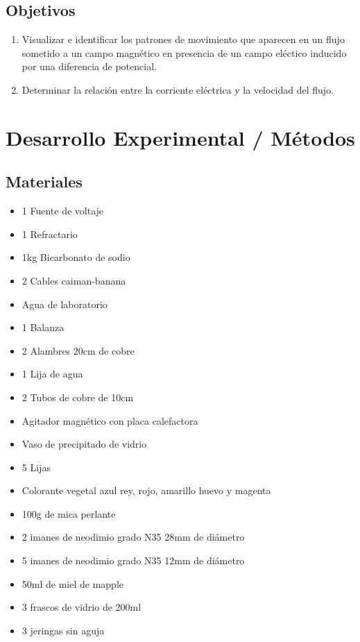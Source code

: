 \documentclass[article,12pt]{elsarticle}
\begin{document}
    \subsection{Objetivos}
    \begin{enumerate}
        \item Visualizar e identificar los patrones de movimiento que aparecen en un flujo sometido a un campo magnético en presencia de un campo eléctico inducido por una diferencia de potencial.
        \item Determinar la relación entre la corriente eléctrica y la velocidad del flujo.
    \end{enumerate}
\section{Desarrollo Experimental / Métodos}
    \subsection{Materiales}
    \begin{itemize}
    \item 1 Fuente de voltaje
    \item 1 Refractario
    \item 1kg Bicarbonato de sodio
    \item 2 Cables caiman-banana
    \item Agua de laboratorio
    \item 1 Balanza 
    \item 2 Alambres 20cm de cobre
    \item 1 Lija de agua
    \item 2 Tubos de cobre de 10cm
    \item Agitador magnético con placa calefactora
    \item Vaso de precipitado de vidrio
    \item 5 Lijas
    \item Colorante vegetal azul rey, rojo, amarillo huevo y magenta
    \item 100g de mica perlante
    \item 2 imanes de neodimio grado N35 28mm de diámetro
    \item 5 imanes de neodimio grado N35 12mm de diámetro
    \item 50ml de miel de mapple
    \item 3 frascos de vidrio de 200ml
    \item 3 jeringas sin aguja
    \end{itemize}
\end{document}
